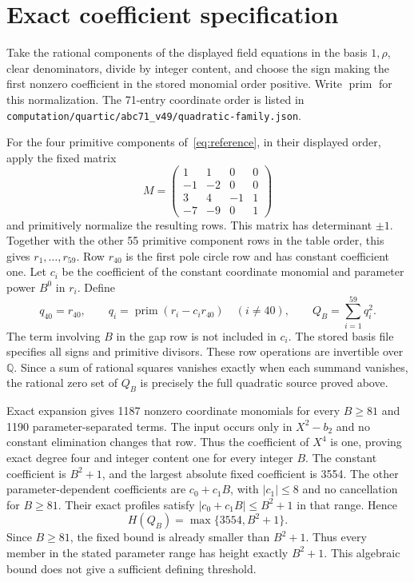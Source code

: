 \documentclass[11pt,a4paper]{article}
\newcommand{\Q}{\mathbb Q}\newcommand{\Z}{\mathbb Z}
\begin{document}
\section{Exact coefficient specification}
Take the rational components of the displayed field equations in
the basis $1,\rho$, clear denominators, divide by integer content,
and choose the sign making the first nonzero coefficient in the
stored monomial order positive. Write $\operatorname{prim}$ for
this normalization. The 71-entry coordinate order is listed in
\nolinkurl{computation/quartic/abc71_v49/quadratic-family.json}.

For the four primitive components of~\eqref{eq:reference}, in their
 displayed order, apply the fixed matrix
\[
 M=\begin{pmatrix}
 1&1&0&0\\
 -1&-2&0&0\\
 3&4&-1&1\\
 -7&-9&0&1
 \end{pmatrix}
\]
 and primitively normalize the resulting rows. This matrix has
 determinant $\pm1$. Together with the other 55 primitive component
 rows in the table order, this gives $r_1,\ldots,r_{59}$.
 Row $r_{40}$ is the first pole circle row and has constant
 coefficient one. Let $c_i$ be the coefficient of the constant
 coordinate monomial and parameter power $B^0$ in $r_i$. Define
\[
 q_{40}=r_{40},\qquad
 q_i=\operatorname{prim}(r_i-c_i r_{40})\quad(i\ne40),\qquad
                         Q_B=\sum_{i=1}^{59}q_i^2.
\]
 The term involving $B$ in the gap row is not included in $c_i$.
The stored basis file specifies all signs and primitive divisors.
These row operations are invertible over $\Q$. Since a sum of
rational squares vanishes exactly when each summand vanishes,
the rational zero set of $Q_B$ is precisely the full quadratic
source proved above.

Exact expansion gives 1187 nonzero coordinate monomials for every
$B\ge81$ and 1190 parameter-separated terms. The input occurs
only in $X^2-b_2$ and no constant elimination changes that row.
Thus the coefficient of $X^4$ is one, proving exact degree four
and integer content one for every integer $B$.
The constant coefficient is $B^2+1$, and the largest absolute
fixed coefficient is 3554. The other parameter-dependent
coefficients are $c_0+c_1B$, with $|c_1|\le8$ and no cancellation
for $B\ge81$. Their exact profiles satisfy
$|c_0+c_1B|\le B^2+1$ in that range. Hence
\[
                          H(Q_B)=\max\{3554,B^2+1\}.
\]
Since $B\ge81$, the fixed bound is already smaller than $B^2+1$.
Thus every member in the stated parameter range has height exactly
$B^2+1$. This algebraic bound does not give a sufficient defining
threshold.
\end{document}
